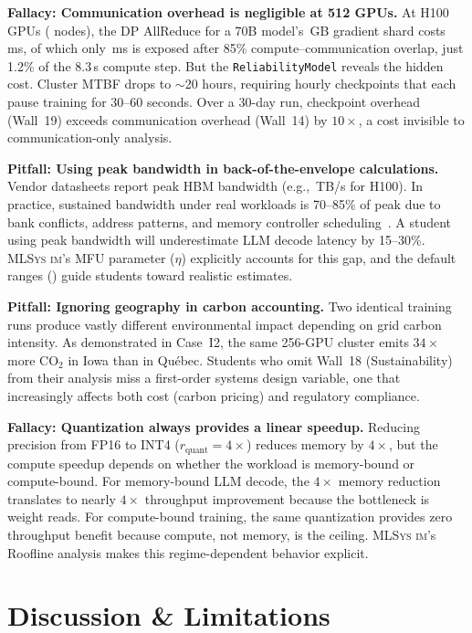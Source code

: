 \documentclass[10pt,twocolumn]{article}
\newcommand{\mlsysim}{\mbox{\textsc{MLSys}\,\textperiodcentered\,\textsc{im}}\xspace}
\newcommand{\cval}[1]{\pgfmathprintnumber[fixed, precision=1, 1000 sep={\,}]{#1}}
\newcommand{\cvalii}[1]{\pgfmathprintnumber[fixed, precision=2, 1000 sep={\,}]{#1}}
\newcommand{\cvalint}[1]{\pgfmathprintnumber[fixed, precision=0, 1000 sep={\,}]{#1}}
\begin{document}
\textbf{Fallacy: Communication overhead is negligible at 512 GPUs.}
At \cvalint{\RthreeGPUs} H100 GPUs (\cvalint{\RthreeNodes} nodes), the DP AllReduce for a 70B model's \cval{\RthreeGradShardGB}\,GB gradient shard costs \cvalint{\RthreeARms}\,ms, of which only \cvalint{\RthreeExposedMs}\,ms is exposed after 85\% compute--communication overlap, just 1.2\% of the 8.3\,s compute step. But the \texttt{ReliabilityModel} reveals the hidden cost. Cluster MTBF drops to $\sim$20 hours, requiring hourly checkpoints that each pause training for 30--60 seconds. Over a 30-day run, checkpoint overhead (Wall~19) exceeds communication overhead (Wall~14) by $10{\times}$, a cost invisible to communication-only analysis.

\textbf{Pitfall: Using peak bandwidth in back-of-the-envelope calculations.}
Vendor datasheets report peak HBM bandwidth (e.g., \cvalii{\HhBWTBs}\,TB/s for H100). In practice, sustained bandwidth under real workloads is 70--85\% of peak due to bank conflicts, address patterns, and memory controller scheduling~\citep{nvidia2023h100}. A student using peak bandwidth will underestimate LLM decode latency by 15--30\%. \mlsysim's MFU parameter ($\eta$) explicitly accounts for this gap, and the default ranges () guide students toward realistic estimates.

\textbf{Pitfall: Ignoring geography in carbon accounting.}
Two identical training runs produce vastly different environmental impact depending on grid carbon intensity. As demonstrated in Case~I2, the same 256-GPU cluster emits $34{\times}$ more CO$_2$ in Iowa than in Qu\'ebec. Students who omit Wall~18 (Sustainability) from their analysis miss a first-order systems design variable, one that increasingly affects both cost (carbon pricing) and regulatory compliance.

\textbf{Fallacy: Quantization always provides a linear speedup.}
Reducing precision from FP16 to INT4 ($r_{\text{quant}} = 4{\times}$) reduces memory by $4{\times}$, but the compute speedup depends on whether the workload is memory-bound or compute-bound. For memory-bound LLM decode, the $4{\times}$ memory reduction translates to nearly $4{\times}$ throughput improvement because the bottleneck is weight reads. For compute-bound training, the same quantization provides zero throughput benefit because compute, not memory, is the ceiling. \mlsysim's Roofline analysis makes this regime-dependent behavior explicit.

\section{Discussion \& Limitations}
\label{sec:discussion}
\end{document}
